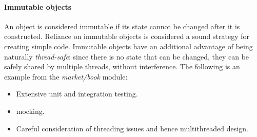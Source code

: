 \paragraph{Immutable objects}
An object is considered immutable if its state cannot be changed after it is constructed. Reliance on immutable objects is considered a sound strategy for creating simple code. Immutable objects have an additional advantage of being naturally \textit{thread-safe}: since there is no state that can be changed, they can be safely shared by multiple threads, without interference. The following is an example from the \textit{market/book} module:



\begin{itemize}
\item Extensive unit and integration testing.
\item mocking.
\item Careful consideration of threading issues and hence multithreaded design.


\end{itemize}
